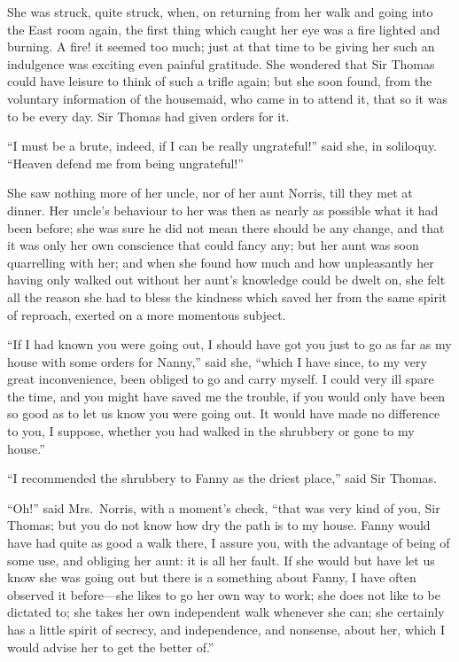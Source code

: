 \documentclass{article}
\begin{document}
She was struck, quite struck, when, on returning from her
walk and going into the East room again, the first thing
which caught her eye was a fire lighted and burning.
A fire! it seemed too much; just at that time to be giving
her such an indulgence was exciting even painful gratitude.
She wondered that Sir Thomas could have leisure to think
of such a trifle again; but she soon found, from the voluntary
information of the housemaid, who came in to attend it,
that so it was to be every day.  Sir Thomas had given
orders for it.

``I must be a brute, indeed, if I can be really ungrateful!''
said she, in soliloquy.  ``Heaven defend me from
being ungrateful!''

She saw nothing more of her uncle, nor of her aunt Norris,
till they met at dinner.  Her uncle's behaviour to her
was then as nearly as possible what it had been before;
she was sure he did not mean there should be any change,
and that it was only her own conscience that could fancy any;
but her aunt was soon quarrelling with her; and when she
found how much and how unpleasantly her having only walked
out without her aunt's knowledge could be dwelt on,
she felt all the reason she had to bless the kindness
which saved her from the same spirit of reproach,
exerted on a more momentous subject.

``If I had known you were going out, I should have got you
just to go as far as my house with some orders for Nanny,''
said she, ``which I have since, to my very great inconvenience,
been obliged to go and carry myself.  I could very ill
spare the time, and you might have saved me the trouble,
if you would only have been so good as to let us know you
were going out.  It would have made no difference to you,
I suppose, whether you had walked in the shrubbery or gone
to my house.''

``I recommended the shrubbery to Fanny as the driest place,''
said Sir Thomas.

``Oh!'' said Mrs.\ Norris, with a moment's check,
``that was very kind of you, Sir Thomas; but you do not
know how dry the path is to my house.  Fanny would have
had quite as good a walk there, I assure you, with the
advantage of being of some use, and obliging her aunt:
it is all her fault.  If she would but have let us know
she was going out but there is a something about Fanny,
I have often observed it before---she likes to go her
own way to work; she does not like to be dictated to;
she takes her own independent walk whenever she can;
she certainly has a little spirit of secrecy, and independence,
and nonsense, about her, which I would advise her to get
the better of.''
\end{document}

